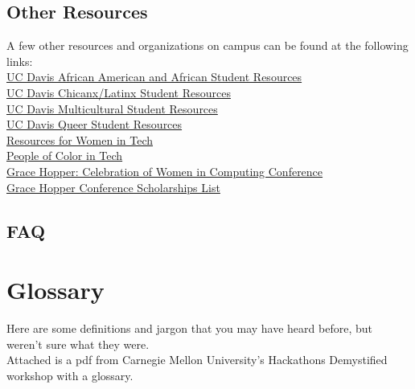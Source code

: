 \documentclass{article}
\begin{document}
\subsection {Other Resources} 
A few other resources and organizations on campus can be found at the following links:  \\

\href{https://www.ucdavis.edu/admissions/undergraduate/community/african-american-student-resources/}{UC Davis African American and African Student Resources}\\

\href{https://www.ucdavis.edu/admissions/undergraduate/community/latino-chicano-organizations/}{UC Davis Chicanx/Latinx Student Resources}\\

\href{https://www.ucdavis.edu/admissions/undergraduate/community/}{UC Davis Multicultural Student Resources}\\

\href{http://lgbtqia.ucdavis.edu/connected/student-org.html}{UC Davis Queer Student Resources}\\

\href{https://github.com/cristianoliveira/awesome4girls}{Resources for Women in Tech} \\

\href{http://peopleofcolorintech.com/}{People of Color in Tech}\\

\href{http://ghc.anitaborg.org/}{Grace Hopper: Celebration of Women in Computing Conference}\\

\href{https://github.com/freialobo/GHC-Scholarships}{Grace Hopper Conference Scholarships List}\\
\subsection{FAQ}
\newpage
\section{Glossary}
\label{sec:glossary}
\hspace{0.5cm} Here are some definitions and jargon that you may have heard before, but weren't sure what they were. \\

Attached is a pdf from Carnegie Mellon University's Hackathons Demystified workshop with a glossary. \\

\newpage
\end{document}
